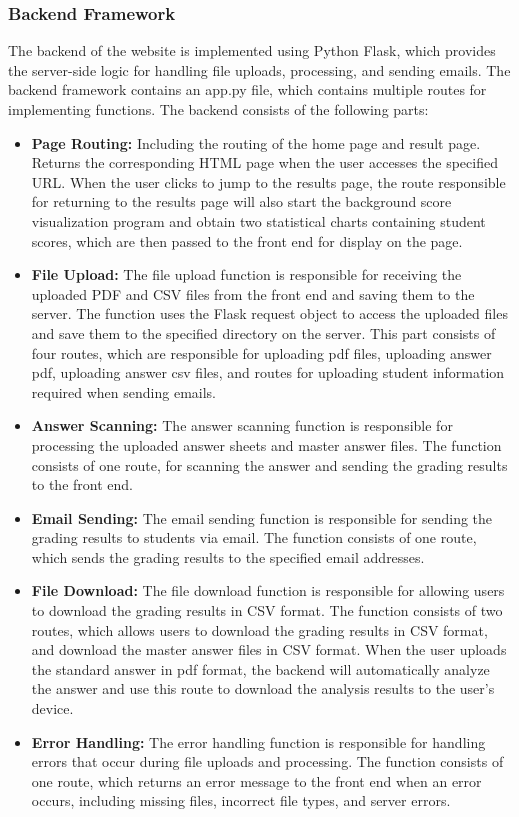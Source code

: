 \documentclass[twocolumn]{article}
\begin{document}
        \subsubsection{Backend Framework}
        The backend of the website is implemented using Python Flask, which provides the server-side logic for handling file uploads, processing, and sending emails. The backend framework contains an app.py file, which contains multiple routes for implementing functions. The backend consists of the following parts:
        \begin{itemize}
            \item \textbf{Page Routing:} Including the routing of the home page and result page. Returns the corresponding HTML page when the user accesses the specified URL. When the user clicks to jump to the results page, the route responsible for returning to the results page will also start the background score visualization program and obtain two statistical charts containing student scores, which are then passed to the front end for display on the page.
            \item \textbf{File Upload:} The file upload function is responsible for receiving the uploaded PDF and CSV files from the front end and saving them to the server. The function uses the Flask request object to access the uploaded files and save them to the specified directory on the server. This part consists of four routes, which are responsible for uploading pdf files, uploading answer pdf, uploading answer csv files, and routes for uploading student information required when sending emails.
            \item \textbf{Answer Scanning:} The answer scanning function is responsible for processing the uploaded answer sheets and master answer files. The function consists of one route, for scanning the answer and sending the grading results to the front end. 
            \item \textbf{Email Sending:} The email sending function is responsible for sending the grading results to students via email. The function consists of one route, which sends the grading results to the specified email addresses.
            \item \textbf{File Download:} The file download function is responsible for allowing users to download the grading results in CSV format. The function consists of two routes, which allows users to download the grading results in CSV format, and download the master answer files in CSV format. When the user uploads the standard answer in pdf format, the backend will automatically analyze the answer and use this route to download the analysis results to the user's device.
            \item \textbf{Error Handling:} The error handling function is responsible for handling errors that occur during file uploads and processing. The function consists of one route, which returns an error message to the front end when an error occurs, including missing files, incorrect file types, and server errors.
        \end{itemize}
\end{document}
